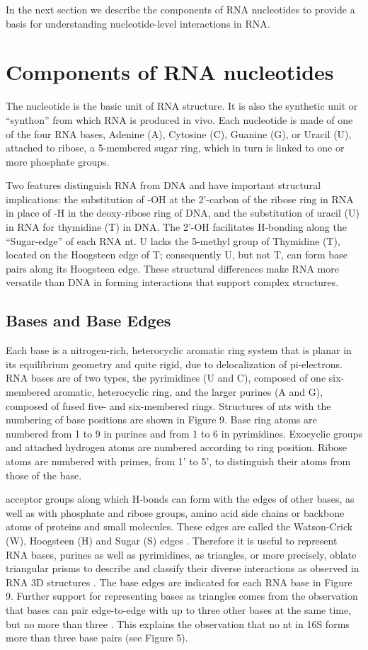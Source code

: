 In the next section we describe the components of RNA nucleotides to provide a
basis for understanding nucleotide-level interactions in RNA. 

\section{Components of RNA nucleotides}

The nucleotide is the basic unit of RNA structure. It is also the synthetic unit
or “synthon” from which RNA is produced in vivo. Each nucleotide is made of one
of the four RNA bases, Adenine (A), Cytosine (C), Guanine (G), or Uracil (U),
attached to ribose, a 5-membered sugar ring, which in turn is linked to one or
more phosphate groups. 

Two features distinguish RNA from DNA and have important structural
implications: the substitution of -OH at the 2'-carbon of the ribose ring in RNA
in place of -H in the deoxy-ribose ring of DNA, and the substitution of uracil
(U) in RNA for thymidine (T) in DNA. The 2’-OH facilitates H-bonding along the
``Sugar-edge'' of each RNA nt. U lacks the 5-methyl group of Thymidine (T),
located on the Hoogsteen edge of T; consequently U, but not T, can form base
pairs along its Hoogsteen edge. These structural differences make RNA more
versatile than DNA in forming interactions that support complex structures.

\subsection{Bases and Base Edges}

Each base is a nitrogen-rich, heterocyclic aromatic ring system that is planar
in its equilibrium geometry and quite rigid, due to delocalization of
pi-electrons. RNA bases are of two types, the pyrimidines (U and C), composed of
one six-membered aromatic, heterocyclic ring, and the larger purines (A and G),
composed of fused five- and six-membered rings. Structures of nts with the
numbering of base positions are shown in Figure 9. Base ring atoms are numbered
from 1 to 9 in purines and from 1 to 6 in pyrimidines. Exocyclic groups and
attached hydrogen atoms are numbered according to ring position. Ribose atoms
are numbered with primes, from 1' to 5', to distinguish their atoms from those
of the base. 

acceptor groups along which H-bonds can form with the edges of other bases, as
well as with phosphate and ribose groups, amino acid side chains or backbone
atoms of proteins and small molecules. These edges are called the Watson-Crick
(W), Hoogsteen (H) and Sugar (S) edges \cite{Leontis2001}. Therefore it is
useful to represent RNA bases, purines as well as pyrimidines, as triangles, or
more precisely, oblate triangular prisms to describe and classify their diverse
interactions as observed in RNA 3D structures \cite{Hoehndorf2011}. The base
edges are indicated for each RNA base in Figure 9. Further support for
representing bases as triangles comes from the observation that bases can pair
edge-to-edge with up to three other bases at the same time, but no more than
three \cite{AbuAlmakarem2012b}. This explains the observation that no nt in 16S
forms more than three base pairs (see Figure 5). 

